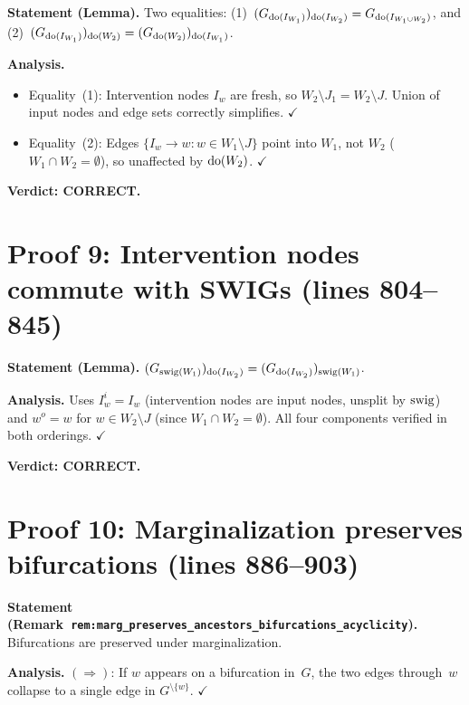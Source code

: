 \documentclass{article}
\begin{document}
\textbf{Statement (Lemma).}
Two equalities: (1)~$(G_{\operatorname{do}(I_{W_1})})_{\operatorname{do}(I_{W_2})} = G_{\operatorname{do}(I_{W_1\cup W_2})}$,
and (2)~$(G_{\operatorname{do}(I_{W_1})})_{\operatorname{do}(W_2)} = (G_{\operatorname{do}(W_2)})_{\operatorname{do}(I_{W_1})}$.

\textbf{Analysis.}
\begin{itemize}
  \item Equality~(1): Intervention nodes $I_w$ are fresh, so $W_2\setminus J_1=W_2\setminus J$.
    Union of input nodes and edge sets correctly simplifies.  $\checkmark$
  \item Equality~(2): Edges $\{I_w\to w:w\in W_1\setminus J\}$ point into $W_1$, not $W_2$
    ($W_1\cap W_2=\emptyset$), so unaffected by $\operatorname{do}(W_2)$.  $\checkmark$
\end{itemize}

\textbf{Verdict: CORRECT.}

\section{Proof 9: Intervention nodes commute with SWIGs (lines 804--845)}

\textbf{Statement (Lemma).}
$(G_{\mathrm{swig}(W_1)})_{\operatorname{do}(I_{W_2})} = (G_{\operatorname{do}(I_{W_2})})_{\mathrm{swig}(W_1)}$.

\textbf{Analysis.}
Uses $I_w^i=I_w$ (intervention nodes are input nodes, unsplit by $\mathrm{swig}$)
and $w^o=w$ for $w\in W_2\setminus J$ (since $W_1\cap W_2=\emptyset$).
All four components verified in both orderings.  $\checkmark$

\textbf{Verdict: CORRECT.}

\section{Proof 10: Marginalization preserves bifurcations (lines 886--903)}

\textbf{Statement (Remark~\texttt{rem:marg\_preserves\_ancestors\_bifurcations\_acyclicity}).}
Bifurcations are preserved under marginalization.

\textbf{Analysis.}
$(\Rightarrow)$: If $w$ appears on a bifurcation in~$G$, the two edges through~$w$
collapse to a single edge in $G^{\setminus\{w\}}$.  $\checkmark$
\end{document}
